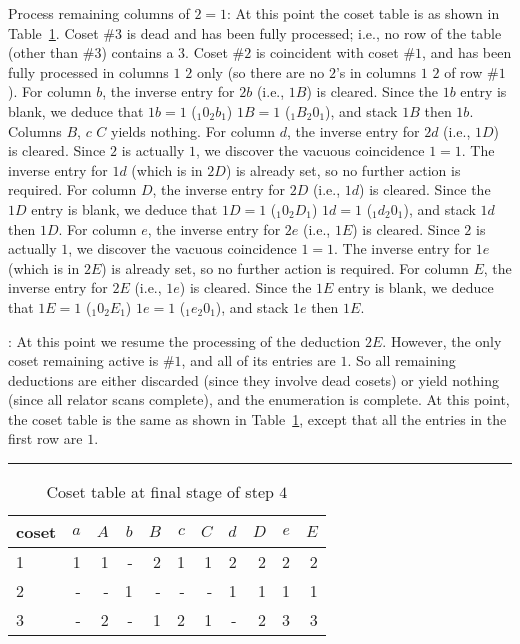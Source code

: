 Process remaining columns of $2=1$:
At this point the coset table is as shown in Table~\ref{tab:step4f}.
Coset \#$3$ is dead and has been fully processed; i.e., no row of the table
  (other than \#$3$) contains a $3$.
Coset \#$2$ is coincident with coset \#$1$, and has been fully processed
  in columns $1$ \amp $2$ only (so there are no $2$'s in columns $1$ \amp
  $2$ of row \#$1$).
%
For column $b$, the inverse entry for $2b$ (i.e., $1B$) is cleared.
Since the $1b$ entry is blank, we deduce that $1b=1$ ($_1 0_2 b_1$) \amp
  $1B=1$ ($_1 B_2 0_1$), and stack $1B$ then $1b$.
%
Columns $B$, $c$ \amp $C$ yields nothing.
%
For column $d$, the inverse entry for $2d$ (i.e., $1D$) is cleared.
Since $2$ is actually $1$, we discover the vacuous coincidence $1=1$.
The inverse entry for $1d$ (which is in $2D$) is already set, so no
  further action is required.
%
For column $D$, the inverse entry for $2D$ (i.e., $1d$) is cleared.
Since the $1D$ entry is blank, we deduce that $1D=1$ ($_1 0_2 D_1$) \amp
  $1d=1$ ($_1 d_2 0_1$), and stack $1d$ then $1D$.
%
For column $e$, the inverse entry for $2e$ (i.e., $1E$) is cleared.
Since $2$ is actually $1$, we discover the vacuous coincidence $1=1$.
The inverse entry for $1e$ (which is in $2E$) is already set, so no
  further action is required.
%
For column $E$, the inverse entry for $2E$ (i.e., $1e$) is cleared.
Since the $1E$ entry is blank, we deduce that $1E=1$ ($_1 0_2 E_1$) \amp
  $1e=1$ ($_1 e_2 0_1$), and stack $1e$ then $1E$.

:
At this point we resume the processing of the deduction $2E$.
However, the only coset remaining active is \#$1$, and all of its entries
  are $1$.
So all remaining deductions are either discarded (since they involve dead
  cosets) or yield nothing (since all relator scans complete), and the
  enumeration is complete.
At this point, the coset table is the same as shown in
  Table~\ref{tab:step4f}, except that all the entries in the first row
  are $1$.

\begin{table}
\hrule
\caption{Coset table at final stage of step $4$}
\label{tab:step4f}
\smallskip
\renewcommand{\arraystretch}{0.875}
\begin{tabular*}{\textwidth}{@{\extracolsep{\fill}}lrrrrrrrrrr} 
\hline\hline
coset & $a$ & $A$ & $b$ & $B$ & $c$ & $C$ & $d$ & $D$ & $e$ & $E$ \\ 
\hline
 1 & 1 & 1 & - & 2 & 1 & 1 & 2 & 2 & 2 & 2 \\
 2 & - & - & 1 & - & - & - & 1 & 1 & 1 & 1 \\
 3 & - & 2 & - & 1 & 2 & 1 & - & 2 & 3 & 3 \\
\hline\hline
\end{tabular*}
\end{table}

